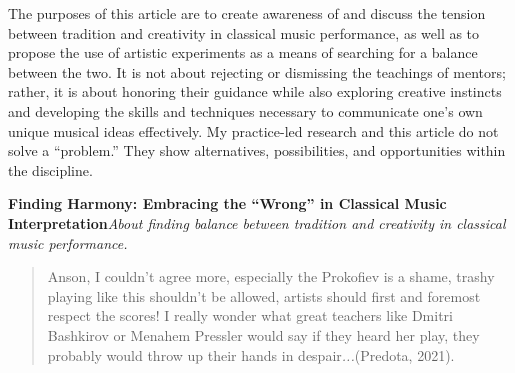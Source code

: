 \documentclass[authordate, empirical, issue]{jote-new-article}
\begin{document}
The purposes of this article are to create awareness of and discuss the tension between tradition and creativity in classical music performance, as well as to propose the use of artistic experiments as a means of searching for a balance between the two. It is not about rejecting or dismissing the teachings of mentors; rather, it is about honoring their guidance while also exploring creative instincts and developing the skills and techniques necessary to communicate one's own unique musical ideas effectively. My practice-led research and this article do not solve a “problem.” They show alternatives, possibilities, and opportunities within the discipline.























\textbf{Finding Harmony: Embracing the “Wrong” in Classical Music Interpretation}\emph{About finding balance between tradition and creativity in classical music performance.}







\begin{quote}
  Anson, I couldn't agree more, especially the Prokofiev is a shame, trashy playing like this shouldn't be allowed, artists should first and foremost respect the scores! I really wonder what great teachers like Dmitri Bashkirov or Menahem Pressler would say if they heard her play, they probably would throw up their hands in despair\emph{...}(Predota, 2021).
\end{quote}
\end{document}
